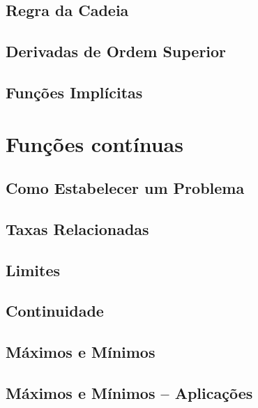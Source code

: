 \documentclass{svmono}
\begin{document}
\section{Regra da Cadeia}
\label{sec:chainrule}

\section{Derivadas de Ordem Superior}
\label{sec:higherderivs}

\section{Funções Implícitas}
\label{sec:implicitfunc}

\begin{chapterproblems}
\end{chapterproblems}

\chapter{Funções contínuas}
\label{chp:contfunc}

\section{Como Estabelecer um Problema}
\label{sec:howtoproblem}

\section{Taxas Relacionadas}
\label{sec:relatedrates}

\section{Limites}
\label{sec:limits}

\section{Continuidade}
\label{sec:continuity}

\section{Máximos e Mínimos}
\label{sec:maxmin}

\section{Máximos e Mínimos -- Aplicações}
\label{sec:maxminappl}
\end{document}
